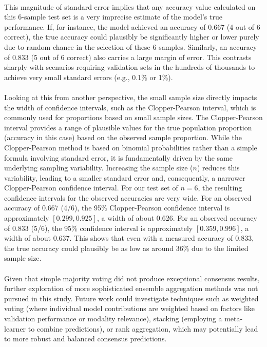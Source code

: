 \documentclass[12pt,a4paper]{report}
\begin{document}
\\
This magnitude of standard error implies that any accuracy value calculated on this 6-sample test set is a very imprecise estimate of the model's true performance. If, for instance, the model achieved an accuracy of 0.667 (4 out of 6 correct), the true accuracy could plausibly be significantly higher or lower purely due to random chance in the selection of these 6 samples. Similarly, an accuracy of 0.833 (5 out of 6 correct) also carries a large margin of error. This contrasts sharply with scenarios requiring validation sets in the hundreds of thousands to achieve very small standard errors (e.g., 0.1\% or 1\%).\\
\\
Looking at this from another perspective, the small sample size directly impacts the width of confidence intervals, such as the Clopper-Pearson interval, which is commonly used for proportions based on small sample sizes. The Clopper-Pearson interval provides a range of plausible values for the true population proportion (accuracy in this case) based on the observed sample proportion. While the Clopper-Pearson method is based on binomial probabilities rather than a simple formula involving standard error, it is fundamentally driven by the same underlying sampling variability. Increasing the sample size ($n$) reduces this variability, leading to a smaller standard error and, consequently, a narrower Clopper-Pearson confidence interval. For our test set of $n=6$, the resulting confidence intervals for the observed accuracies are very wide. For an observed accuracy of 0.667 (4/6), the 95\% Clopper-Pearson confidence interval is approximately $[0.299, 0.925]$, a width of about 0.626. For an observed accuracy of 0.833 (5/6), the 95\% confidence interval is approximately $[0.359, 0.996]$, a width of about 0.637. This shows that even with a measured accuracy of 0.833, the true accuracy could plausibly be as low as around 36\% due to the limited sample size.\\
\\
Given that simple majority voting did not produce exceptional consensus results, further exploration of more sophisticated ensemble aggregation methods was not pursued in this study. Future work could investigate techniques such as weighted voting (where individual model contributions are weighted based on factors like validation performance or modality relevance), stacking (employing a meta-learner to combine predictions), or rank aggregation, which may potentially lead to more robust and balanced consensus predictions.
\end{document}
